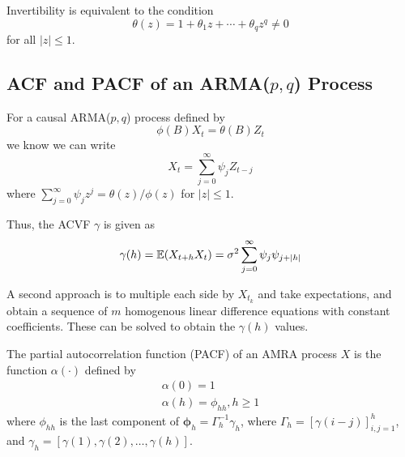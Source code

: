 \begin{thm}
  \label{defn:arma_processes:6}
  Invertibility is equivalent to the condition
  \begin{equation}
    \label{eq:24}
    \theta(z) = 1 + \theta_{1}z + \cdots + \theta_{q} z^{q} \neq 0
  \end{equation} for all $|z| \leq 1$.
\end{thm}

\subsection{ACF and PACF of an ARMA($p, q$) Process}
\label{sec:acf-pacf-an}

\begin{thm}
  \label{defn:arma_processes:7}
  For a causal ARMA($p, q$) process defined by
  \begin{equation}
    \label{eq:28}
    \phi(B) X_{t} = \theta(B) Z_{t}
  \end{equation} we know we can write
  \begin{equation}
    \label{eq:29}
    X_{t} = \sum_{j=0}^{\infty} \psi_{j} Z_{t-j}
  \end{equation} where $\sum_{j=0}^{\infty} \psi_{j} z^{j} = \theta(z)
  / \phi(z)$ for $|z| \leq 1$.

  Thus, the ACVF $\gamma$ is given as
  \begin{equation}
    \label{eq:30}
    \gamma(h) = \E{X_{t+h} X_{t}} = \sigma^{2} \sum_{j=0}^{\infty}
    \psi_{j} \psi_{j+|h|}
  \end{equation}

  A second approach is to multiple each side by $X_{t_k}$ and take
  expectations, and obtain a sequence of $m$ homogenous linear
  difference equations with constant coefficients.  These can be
  solved to obtain the $\gamma(h)$ values.
\end{thm}

\begin{defn}[PACF]
  \label{defn:arma_processes:8}
  The partial autocorrelation function (PACF) of an AMRA process $X$
  is the function $\alpha(\cdot)$ defined by
  \begin{align}
    \label{eq:31}
    \alpha(0) = 1 \\
    \alpha(h) = \phi_{hh}, h \geq 1
  \end{align} where $\phi_{hh}$ is the last component of
  $\mathbf{\phi}_{h} = \Gamma_{h}^{-1} \gamma_{h}$, where $\Gamma_{h}
  = [\gamma(i - j)]^{h}_{i,j = 1}$, and $\gamma_{h} = [\gamma(1),
  \gamma(2), \dots, \gamma(h)]$.
\end{defn}

